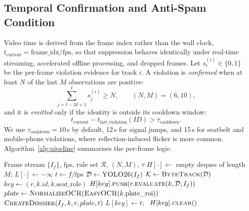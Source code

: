 \documentclass[conference]{IEEEtran}
\begin{document}
\subsection{Temporal Confirmation and Anti-Spam Condition}
Video time is derived from the frame index rather than the wall clock, $t_{\mathrm{current}} = \text{frame\_idx}/\text{fps}$, so that suppression behaves identically under real-time streaming, accelerated offline processing, and dropped frames. Let $s_t^{(i)} \in \{0,1\}$ be the per-frame violation evidence for track $i$. A violation is \emph{confirmed} when at least $N$ of the last $M$ observations are positive:
\begin{equation}
\sum_{j=t-M+1}^{t} s_j^{(i)} \geq N, \qquad (N, M) = (6, 10),
\end{equation}
and it is \emph{emitted} only if the identity is outside its cooldown window:
\begin{equation}
t_{\mathrm{current}} - t_{\mathrm{last\_violation}}(ID) > \tau_{\mathrm{cooldown}}.
\end{equation}
We use $\tau_{\mathrm{cooldown}} = 10$\,s by default, 12\,s for signal jumps, and 15\,s for seatbelt and mobile-phone violations, where reflection-induced flicker is more common. Algorithm~\ref{alg:pipeline} summarises the per-frame logic.

\begin{algorithm}[!t]
\caption{Identity-Aware Multi-Violation Enforcement}
\label{alg:pipeline}
\begin{algorithmic}[1]
\Require Frame stream $\{I_f\}$, fps, rule set $\mathcal{R}$, $(N,M)$, $\tau$
\State $H[\cdot] \gets$ empty deques of length $M$; $L[\cdot] \gets -\infty$
  \State $t \gets f / \text{fps}$
  \State $\mathcal{D} \gets \textsc{YOLO26}(I_f)$ 
  \State $\mathcal{K} \gets \textsc{ByteTrack}(\mathcal{D})$
    \State $key \gets (r, k.id, k.\text{seat\_role})$
    \State $H[key].\textsc{push}(r.\textsc{evaluate}(k, \mathcal{D}, I_f))$
      \State $plate \gets \textsc{NormalizeOCR}(\textsc{EasyOCR}(k.\text{plate\_roi}))$
      \State $\textsc{CreateDossier}(I_f, k, r, plate, t)$
      \State $L[key] \gets t$; \ $H[key].\textsc{clear}()$
    \EndIf
  \EndFor
\EndFor
\end{algorithmic}
\end{algorithm}

\end{document}
